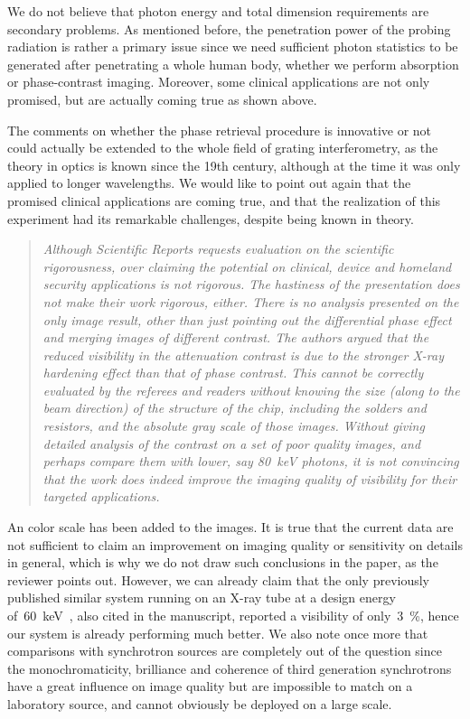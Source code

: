 \documentclass[a4paper,english]{scrartcl}
\newenvironment{reviewerquote}{\begin{quote}\itshape}{\end{quote}}
\begin{document}
We do not believe that photon energy and total dimension
requirements are secondary problems. As mentioned before, the penetration
power of the probing radiation is rather a primary issue since we need
sufficient photon statistics to be generated after penetrating a whole human
body, whether we
perform absorption or phase-contrast imaging. Moreover, some clinical
applications are not only promised, but are actually coming true as shown
above.

The comments on whether the phase
retrieval procedure is innovative or not could actually be extended to the
whole field of grating interferometry, as the theory in optics is known
since the 19th century, although at the time it was only applied to longer
wavelengths. We would like to point out again that the promised clinical
applications are coming true, and that the realization of this experiment
had its remarkable challenges, despite being known in theory.

\begin{reviewerquote}
Although Scientific Reports requests evaluation on the
scientific rigorousness, over claiming the potential on clinical, device and
homeland security applications is not rigorous. The hastiness of the
presentation does not make their work rigorous, either. There is no analysis
presented on the only image result, other than just pointing out the
differential phase effect and merging images of different contrast. The
authors argued that the reduced visibility in the attenuation contrast is
due to the stronger X-ray hardening effect than that of phase contrast. This
cannot be correctly evaluated by the referees and readers without knowing
the size (along to the beam direction) of the structure of the chip,
including the solders and resistors, and the absolute gray scale of those
images. Without giving detailed analysis of the contrast on a set of poor
quality images, and perhaps compare them with lower, say \SI{80}{\kilo\eV} photons, it
is not convincing that the work does indeed improve the imaging quality of
visibility for their targeted applications.
\end{reviewerquote}

An color scale has been added to the images.
It is true that the current data are not sufficient to claim an improvement
on imaging quality or sensitivity on details in
general, which is why we do not draw such conclusions in the paper, as the
reviewer points out. However, we can already claim that the only
previously published similar system running on an X-ray tube
at a design energy of~\SI{60}{\kilo\eV}~\cite{:/content/aip/journal/rsi/80/5/10.1063/1.3127712}, also
cited in the manuscript, reported a
visibility of only~\SI{3}{\percent}, hence our system is already performing
much better. We also note once more that comparisons with
synchrotron sources are completely out of the question since the
monochromaticity, brilliance and coherence of third generation synchrotrons
have a great influence on image quality but are impossible to match on a
laboratory source, and cannot obviously be deployed on a large scale.
\end{document}
